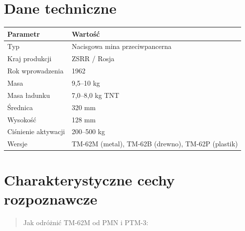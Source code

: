 \documentclass[12pt,openany,oneside]{book}
\begin{document}
\section{Dane techniczne}\label{dane-techniczne-115}

\begin{longtable}[]{@{}ll@{}}
\toprule\noalign{}
Parametr & Wartość \\
\midrule\noalign{}
\endhead
\bottomrule\noalign{}
\endlastfoot
Typ & Nacisgowa mina przeciwpancerna \\
Kraj produkcji & ZSRR / Rosja \\
Rok wprowadzenia & 1962 \\
Masa & 9,5--10 kg \\
Masa ładunku & 7,0--8,0 kg TNT \\
Średnica & 320 mm \\
Wysokość & 128 mm \\
Ciśnienie aktywacji & 200--500 kg \\
Wersje & TM-62M (metal), TM-62B (drewno), TM-62P (plastik) \\
\end{longtable}

\section{Charakterystyczne cechy
rozpoznawcze}\label{charakterystyczne-cechy-rozpoznawcze-115}

\begin{quote}
Jak odróżnić TM-62M od PMN i PTM-3:
\end{quote}
\end{document}
